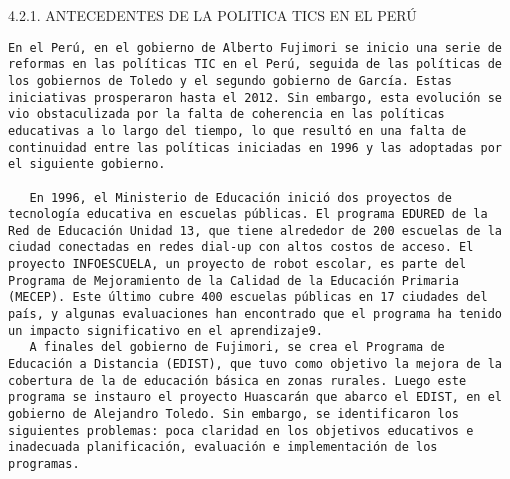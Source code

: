4.2.1. ANTECEDENTES DE LA POLITICA TICS EN EL PERÚ

\begin{verbatim}
En el Perú, en el gobierno de Alberto Fujimori se inicio una serie de reformas en las políticas TIC en el Perú, seguida de las políticas de los gobiernos de Toledo y el segundo gobierno de García. Estas iniciativas prosperaron hasta el 2012. Sin embargo, esta evolución se vio obstaculizada por la falta de coherencia en las políticas educativas a lo largo del tiempo, lo que resultó en una falta de continuidad entre las políticas iniciadas en 1996 y las adoptadas por el siguiente gobierno. 

   En 1996, el Ministerio de Educación inició dos proyectos de tecnología educativa en escuelas públicas. El programa EDURED de la Red de Educación Unidad 13, que tiene alrededor de 200 escuelas de la ciudad conectadas en redes dial-up con altos costos de acceso. El proyecto INFOESCUELA, un proyecto de robot escolar, es parte del Programa de Mejoramiento de la Calidad de la Educación Primaria (MECEP). Este último cubre 400 escuelas públicas en 17 ciudades del país, y algunas evaluaciones han encontrado que el programa ha tenido un impacto significativo en el aprendizaje9. 
   A finales del gobierno de Fujimori, se crea el Programa de Educación a Distancia (EDIST), que tuvo como objetivo la mejora de la cobertura de la de educación básica en zonas rurales. Luego este programa se instauro el proyecto Huascarán que abarco el EDIST, en el gobierno de Alejandro Toledo. Sin embargo, se identificaron los siguientes problemas: poca claridad en los objetivos educativos e inadecuada planificación, evaluación e implementación de los programas.
\end{verbatim}

